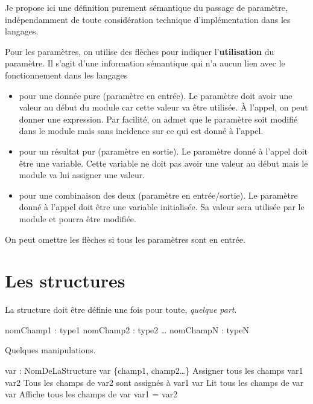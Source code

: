 	\begin{Note}
	Je propose ici une définition purement sémantique
	du passage de paramètre, indépendamment de toute considération
	technique d'implémentation dans les langages.
	\end{Note}

	Pour les paramètres, on utilise des flèches pour indiquer l'\textbf{utilisation} du paramètre.
	Il s'agit d'une information sémantique qui n'a aucun lien avec le fonctionnement dans les langages
		
	\begin{itemize}
	\item \In{}
		pour une donnée pure (paramètre en entrée).
		Le paramètre doit avoir une valeur au début du module
		car cette valeur va être utilisée.
		À l'appel, on peut donner une expression.
		Par facilité,
		on admet que le paramètre soit modifié dans le module
		mais sans incidence sur ce qui est donné à l'appel.
	\item \Out{}
		pour un résultat pur (paramètre en sortie).
		Le paramètre donné à l'appel doit être une variable.
		Cette variable ne doit pas avoir une valeur au début
		mais le module va lui assigner une valeur.
	\item \InOut{}
		pour une combinaison des deux (paramètre en entrée/sortie).
		Le paramètre donné à l'appel doit être une variable initialisée.
		Sa valeur sera utilisée par le module et pourra être modifiée.
	\end{itemize}

	On peut omettre les flèches si tous les paramètres sont en entrée.
	
\section{Les structures}

	La structure doit être définie une fois pour toute, 
	\emph{quelque part}.
	
	\begin{Pseudocode}
		\Decl nomChamp1 : type1
		\Decl nomChamp2 : type2
		\Decl \dots
		\Decl nomChampN : typeN
	\EndStruct
	\end{Pseudocode}

	Quelques manipulations.
	
	\begin{Pseudocode}
	\Decl var : NomDeLaStructure
	\Let var \Gets \{champ1, champ2\dots\} \RComment Assigner tous les champs
	\Let var1 \Gets var2 \RComment Tous les champs de var2 sont assignés à var1
	\Read var \RComment Lit tous les champs de var
	\Write var \RComment Affiche tous les champs de var 
	\Stmt var1 = var2 \RComment {Teste l'égalité de tous les champs}
	\end{Pseudocode}

